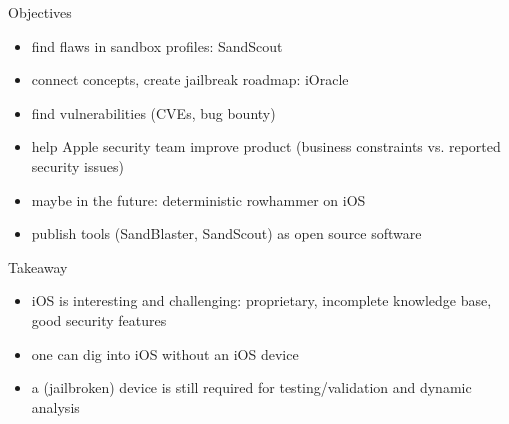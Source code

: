 \documentclass{simple}
\begin{document}
\begin{frame}{Objectives}
  \begin{itemize}
    \item find flaws in sandbox profiles: SandScout
    \item connect concepts, create jailbreak roadmap: iOracle
    \item find vulnerabilities (CVEs, bug bounty)
    \item help Apple security team improve product (business constraints vs. reported security issues)
    \item maybe in the future: deterministic rowhammer on iOS
    \item publish tools (SandBlaster, SandScout) as open source software
  \end{itemize}
\end{frame}

\begin{frame}{Takeaway}
  \begin{itemize}
    \item iOS is interesting and challenging: proprietary, incomplete knowledge base, good security features
    \item one can dig into iOS without an iOS device
    \item a (jailbroken) device is still required for testing/validation and dynamic analysis
  \end{itemize}
\end{frame}
\end{document}
